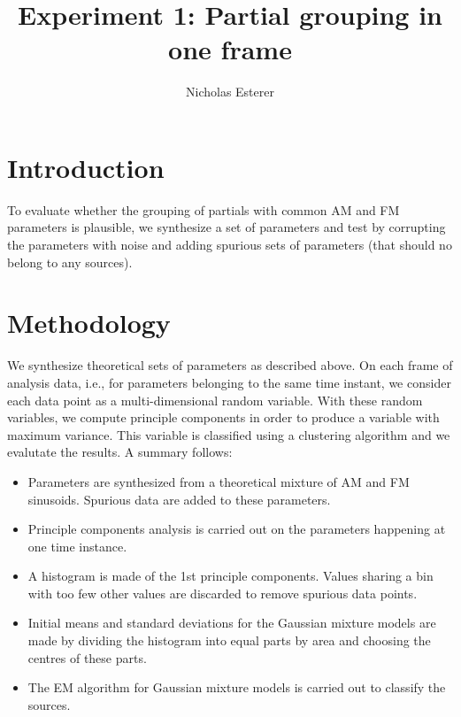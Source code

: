 \documentclass[letter,10pt]{report}
\author{Nicholas Esterer}
\title{Experiment 1: Partial grouping in one frame}
\begin{document}
\maketitle
\tableofcontents
\section{Introduction}
To evaluate whether the grouping of partials with common AM and FM parameters is
plausible, we synthesize a set of parameters and test by corrupting the
parameters with noise and adding spurious sets of parameters (that should no
belong to any sources).
\section{Methodology}
We synthesize theoretical sets of parameters as described above. On each frame
of analysis data, i.e., for parameters belonging to the same time instant, we
consider each data point as a multi-dimensional random variable. With these
random variables, we compute principle components in order to produce a variable
with maximum variance. This variable is classified using a clustering algorithm
and we evalutate the results. A summary follows:
\begin{itemize}
\item 
Parameters are synthesized from a theoretical mixture of AM and FM sinusoids.
Spurious data are added to these parameters.
\item
Principle components analysis is carried out on the parameters happening at
one time instance.
\item
A histogram is made of the 1st principle components. Values sharing a bin with
too few other values are discarded to remove spurious data points.
\item
Initial means and standard deviations for the Gaussian mixture models are made
by dividing the histogram into equal parts by area and choosing the centres of
these parts.
\item
The EM algorithm for Gaussian mixture models is carried out to classify the
sources.
\end{itemize}
\end{document}
